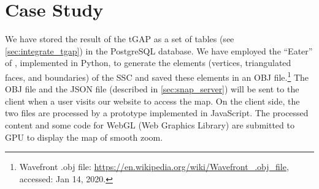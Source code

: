 \documentclass[ijgi,article,submit,moreauthors,pdftex]{Definitions/mdpi}
\begin{document}
%
%
%
%
%
%
%
%






\section{Case Study}
\label{sec:case_study}

We have stored the result of the tGAP 
as a set of tables (see \sect\ref{sec:integrate_tgap}) 
in the PostgreSQL database.
We have employed the ``Eater'' of \citet{Suba2014Merge},
implemented in Python, 
to generate the elements
(vertices, triangulated faces, and boundaries)
of the SSC \citep{vanOosterom2014tGAPSSC} 
and saved these elements in an OBJ file.\footnote{%
Wavefront .obj file:
\url{https://en.wikipedia.org/wiki/Wavefront_.obj_file},
accessed: Jan 14, 2020.}
%
The OBJ file and the JSON file (described in \sect\ref{sec:snap_server}) 
will be sent to the client 
when a user visits our website to access the map.
On the client side,
the two files are processed
by a prototype implemented in JavaScript.
The processed content and some code for WebGL (Web Graphics Library)
are submitted to GPU to display the map of smooth zoom.
\end{document}
